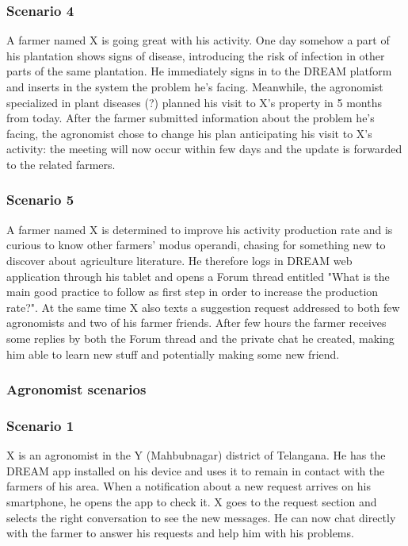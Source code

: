 \subsubsection*{Scenario 4}
A farmer named X is going great with his activity. One day somehow a part of his plantation shows signs of disease, introducing the risk of infection in other parts of the same plantation. He immediately signs in to the DREAM platform and inserts in the system the problem he's facing. Meanwhile, the agronomist specialized in plant diseases (?) planned his visit to X's property in 5 months from today. After the farmer submitted information about the problem he's facing, the agronomist chose to change his plan anticipating his visit to X's activity: the meeting will now occur within few days and the update is forwarded to the related farmers.

\subsubsection*{Scenario 5}
A farmer named X is determined to improve his activity production rate and is curious to know other farmers' modus operandi, chasing for something new to discover about agriculture literature. He therefore logs in DREAM web application through his tablet and opens a Forum thread entitled "What is the main good practice to follow as first step in order to increase the production rate?". At the same time X also texts a suggestion request addressed to both few agronomists and two of his farmer friends. After few hours the farmer receives some replies by both the Forum thread and the private chat he created, making him able to learn new stuff and potentially making some new friend.

\subsubsection{Agronomist scenarios}
\subsubsection*{Scenario 1}
X is an agronomist in the Y (Mahbubnagar) district of Telangana. He has the DREAM app installed on his device and uses it to remain in contact with the farmers of his area. When a notification about a new request arrives on his smartphone, he opens the app to check it. X goes to the request section and selects the right conversation to see the new messages. He can now chat directly with the farmer to answer his requests and help him with his problems.

